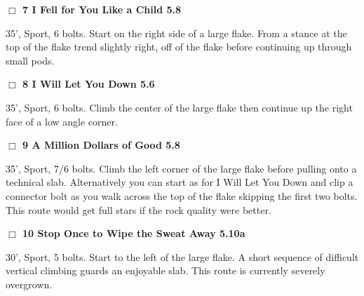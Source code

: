 \begin{multicols}{2}
\needspace{2em}
\label{rt:I Fell for You Like a Child}
\colorbox{green!20}{
\parbox{0.95\linewidth}{
\hspace{-1ex}\textbf{$\Box$
7 I Fell for You Like a Child 5.8  
}}}
\begin{adjustwidth}{1.3em}{}			

35', Sport, 6 bolts. Start on the right side of a large flake. From a stance at the top of the flake trend slightly right, off of the flake before continuing up through small pods.
\end{adjustwidth}




\needspace{2em}
\label{rt:I Will Let You Down}
\colorbox{green!20}{
\parbox{0.95\linewidth}{
\hspace{-1ex}\textbf{$\Box$
8 I Will Let You Down 5.6  
}}}
\begin{adjustwidth}{1.3em}{}			

35', Sport, 6 bolts. Climb the center of the large flake then continue up the right face of a low angle corner.
\end{adjustwidth}




\needspace{2em}
\label{rt:A Million Dollars of Good}
\colorbox{green!20}{
\parbox{0.95\linewidth}{
\hspace{-1ex}\textbf{$\Box$
9 A Million Dollars of Good 5.8  
}}}
\begin{adjustwidth}{1.3em}{}			

35', Sport, 7/6 bolts. Climb the left corner of the large flake before pulling onto a technical slab. Alternatively you can start as for I Will Let You Down and clip a connector bolt as you walk across the top of the flake skipping the first two bolts. This route would get full stars if the rock quality were better.
\end{adjustwidth}




\needspace{2em}
\label{rt:Stop Once to Wipe the Sweat Away}
\colorbox{RoyalBlue!20}{
\parbox{0.95\linewidth}{
\hspace{-1ex}\textbf{$\Box$
10 Stop Once to Wipe the Sweat Away 5.10a  
}}}
\begin{adjustwidth}{1.3em}{}			

30', Sport, 5 bolts. Start to the left of the large flake. A short sequence of difficult vertical climbing guards an enjoyable slab. This route is currently severely overgrown.
\end{adjustwidth}






\end{multicols}
\clearpage